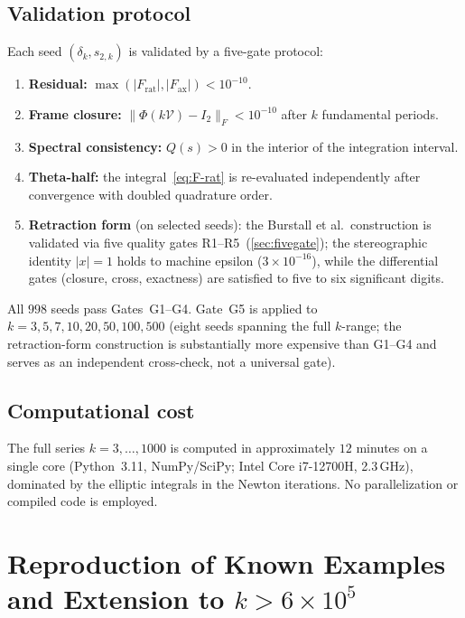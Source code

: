 \documentclass[11pt,a4paper]{article}
\theoremstyle{plain}
\theoremstyle{definition}
\theoremstyle{remark}
\newcommand{\abs}[1]{\lvert #1 \rvert}
\newcommand{\norm}[1]{\lVert #1 \rVert}
\begin{document}
\subsection{Validation protocol}\label{sec:validation}
Each seed $(\delta_k, s_{2,k})$ is validated by a five-gate protocol:
\begin{enumerate}[nosep,label=\textbf{G\arabic*.}]
\item \textbf{Residual:}
  $\max(\abs{F_{\mathrm{rat}}}, \abs{F_{\mathrm{ax}}}) < 10^{-10}$.
\item \textbf{Frame closure:}
  $\norm{\Phi(k\mathcal{V}) - I_2}_F < 10^{-10}$
  after $k$ fundamental periods.
\item \textbf{Spectral consistency:}
  $Q(s) > 0$ in the interior of the integration interval.
\item \textbf{Theta-half:}
  the integral~\eqref{eq:F-rat} is re-evaluated independently after
  convergence with doubled quadrature order.
\item \textbf{Retraction form} (on selected seeds):
  the Burstall et al.\ construction is validated via five quality
  gates R1--R5~(\cref{sec:fivegate}); the stereographic identity
  $\abs{x}=1$ holds to machine epsilon ($3 \times 10^{-16}$),
  while the differential gates (closure, cross, exactness) are
  satisfied to five to six significant digits.
\end{enumerate}
All $998$ seeds pass Gates~G1--G4.  Gate~G5 is applied to
$k = 3, 5, 7, 10, 20, 50, 100, 500$
(eight seeds spanning the full $k$-range; the retraction-form
construction is substantially more expensive than G1--G4
and serves as an independent cross-check, not a universal gate).

\subsection{Computational cost}
The full series $k = 3, \ldots, 1000$ is computed in approximately
$12$ minutes on a single core (Python~3.11, NumPy/SciPy;
Intel Core i7-12700H, 2.3\,GHz), dominated by
the elliptic integrals in the Newton iterations.  No parallelization
or compiled code is employed.


\section{Reproduction of Known Examples and Extension to
  \texorpdfstring{$k > 6\times 10^5$}{k > 600000}}\label{sec:extension}
\end{document}
